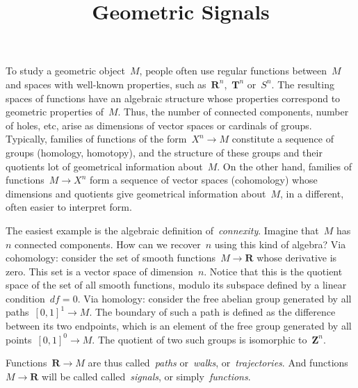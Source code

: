

\newcommand{\1}{\mathbf{1}}
\newcommand{\R}{\mathbf{R}}
\newcommand{\T}{\mathbf{T}}
\newcommand{\Z}{\mathbf{Z}}
\newcommand{\ud}{\mathrm{d}}
\newcommand{\ds}{\displaystyle}

\newcommand{\abs}[1]{\left|#1\right|}
\newcommand{\Abs}[1]{\left\|#1\right\|}
\newcommand{\ABS}[1]{{\left\vert\kern-0.25ex\left\vert\kern-0.25ex\left\vert #1 \right\vert\kern-0.25ex\right\vert\kern-0.25ex\right\vert}}

\newcommand{\parens}[1]{\left(#1\right)} %
\newcommand{\pairing}[2]{\left\langle #1,\,#2\right\rangle} %




\title{Geometric Signals}


To study a geometric object~$M$, people often use regular functions
between~$M$ and spaces with well-known properties, such as~$\R^n$,~$\T^n$
or~$S^n$.  The resulting spaces of functions have an algebraic structure
whose properties correspond to geometric properties of~$M$.
Thus, the number of connected components, number of holes, etc, arise as
dimensions of vector spaces or cardinals of groups.
Typically,
families of functions of the form~$X^n\to M$ constitute a sequence of groups
(homology, homotopy), and the structure of these groups and their quotients
 lot of geometrical information about~$M$.  On the other hand,
families of functions~$M\to X^n$ form a sequence of vector spaces
(cohomology) whose dimensions and quotients give geometrical information
about~$M$, in a different, often easier to interpret form.

The easiest example is the algebraic definition of~\emph{connexity}.  Imagine
that~$M$ has~$n$ connected components.  How can we recover~$n$ using this kind
of algebra?
%
Via cohomology: consider the set of smooth functions~$M\to\R$ whose
derivative is zero.  This set is a vector space of dimension~$n$.
Notice that this is the quotient space of the set of all smooth functions,
modulo its subspace defined by a linear condition~$df=0$.
%
Via homology: consider the free abelian group generated by all
paths~$[0,1]^1\to M$.  The boundary of such a path is defined as the difference
between its two endpoints, which is an element of the free group generated by
all points~$[0,1]^0\to M$.  The quotient of two such groups is isomorphic
to~$\Z^n$.

Functions~$\R\to M$ are thus called~\emph{paths} or~\emph{walks},
or~\emph{trajectories}.  And functions~$M\to\R$ will be called
called~\emph{signals}, or simply~\emph{functions}.

